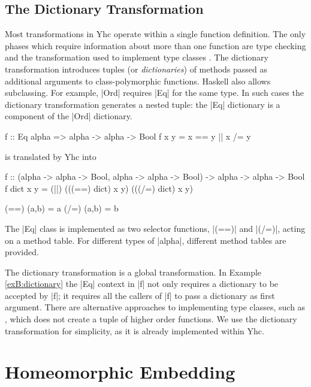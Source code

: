 \subsection{The Dictionary Transformation}
\label{secB:dictionary_transformation}

Most transformations in Yhc operate within a single function definition. The only phases which require information about more than one function are type checking and the transformation used to implement type classes \citep{wadler:type_classes}. The dictionary transformation introduces tuples (or \textit{dictionaries}) of methods passed as additional arguments to class-polymorphic functions. Haskell also allows subclassing. For example, |Ord| requires |Eq| for the same type. In such cases the dictionary transformation generates a nested tuple: the |Eq| dictionary is a component of the |Ord| dictionary.

\begin{example}
\label{exB:dictionary}
\begin{code}
f :: Eq alpha => alpha -> alpha -> Bool
f x y = x == y || x /= y
\end{code}

\noindent is translated by Yhc into

\ignore\begin{code}
f :: (alpha -> alpha -> Bool, alpha -> alpha -> Bool) -> alpha -> alpha -> Bool
f dict x y = (||) (((==) dict) x y) (((/=) dict) x y)

(==) (a,b) = a
(/=) (a,b) = b
\end{code}

The |Eq| class is implemented as two selector functions, |(==)| and |(/=)|, acting on a method table. For different types of |alpha|, different method tables are provided.
\end{example}

The dictionary transformation is a global transformation. In Example \ref{exB:dictionary} the |Eq| context in |f| not only requires a dictionary to be accepted by |f|; it requires all the callers of |f| to pass a dictionary as first argument. There are alternative approaches to implementing type classes, such as \citet{jones:dictionary_free}, which does not create a tuple of higher order functions. We use the dictionary transformation for simplicity, as it is already implemented within Yhc.


\section{Homeomorphic Embedding}
\label{secB:homeomorphic}

